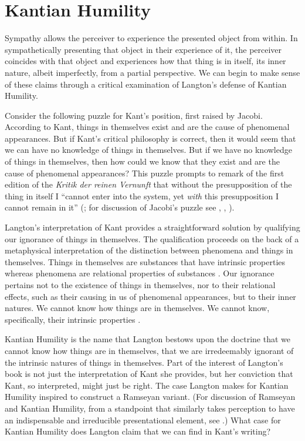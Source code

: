 

\section{Kantian Humility} %
\label{sec:kantian_humility}

Sympathy allows the perceiver to experience the presented object from within. In sympathetically presenting that object in their experience of it, the perceiver coincides with that object and experiences how that thing is in itself, its inner nature, albeit imperfectly, from a partial perspective. We can begin to make sense of these claims through a critical examination of Langton's \citeyearpar{Langton:1998aa} defense of Kantian Humility.

Consider the following puzzle for Kant's position, first raised by Jacobi. According to Kant, things in themselves exist and are the cause of phenomenal appearances. But if Kant's critical philosophy is correct, then it would seem that we can have no knowledge of things in themselves. But if we have no knowledge of things in themselves, then how could we know that they exist and are the cause of phenomenal appearances? This puzzle prompts \citet[304]{Jacobi:1815bs} to remark of the first edition of the \emph{Kritik der reinen Vernunft} that without the presupposition of the thing in itself I ``cannot enter into the system, yet \emph{with} this presupposition I cannot remain in it'' (\citealt[335]{Guyer:1987xe}; for discussion of Jacobi's puzzle see \citealt[247--54]{Allison:1983ly}, \citealt[chapter 15]{Guyer:1987xe}, \citealt[chapter 1]{Langton:1998aa}).

Langton's interpretation of Kant provides a straightforward solution by qualifying our ignorance of things in themselves. The qualification proceeds on the back of a metaphysical interpretation of the distinction between phenomena and things in themselves. Things in themselves are substances that have intrinsic properties whereas phenomena are relational properties of substances \citep[20]{Langton:1998aa}. Our ignorance pertains not to the existence of things in themselves, nor to their relational effects, such as their causing in us of phenomenal appearances, but to their inner natures. We cannot know how things are in themselves. We cannot know, specifically, their intrinsic properties \citep[13]{Langton:1998aa}. 

Kantian Humility is the name that Langton bestows upon the doctrine that we cannot know how things are in themselves, that we are irredeemably ignorant of the intrinsic natures of things in themselves. Part of the interest of Langton's book is not just the interpretation of Kant she provides, but her conviction that Kant, so interpreted, might just be right. The case Langton makes for Kantian Humility inspired \citet{Lewis:2009ax} to construct a Ramseyan variant. (For discussion of Ramseyan and Kantian Humility, from a standpoint that similarly takes perception to have an indispensable and irreducible presentational element, see \citealt{Brewer:2011ks}.) What case for Kantian Humility does Langton claim that we can find in Kant's writing?

